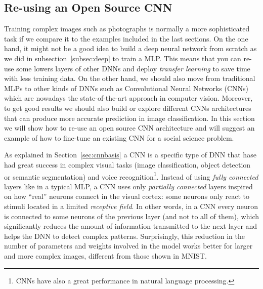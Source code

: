 \subsection{Re-using an Open Source CNN}\label{subsec:tuning}

Training complex images such as photographs is normally a more sophisticated task if we compare it to the examples included in the last sections. On the one hand, it might not be a good idea to build a deep neural network from scratch as we did in subsection~\ref{subsec:deep} to train a MLP. This means that you can re-use some lowers layers of other DNNs and deploy \textit{transfer learning} to save time with less training data. On the other hand, we should also move from traditional MLPs to other kinds of DNNs such as Convolutional Neural Networks (CNNs) which are  nowadays the state-of-the-art approach in computer vision. Moreover, to get good results we should also build or explore different CNNs architectures that can produce more accurate prediction in image classification.  In this section we will show how to re-use an open source CNN architecture and will suggest an example of how to fine-tune an existing CNN for a social science problem.

As explained in Section~\ref{sec:cnnbasis} a CNN is a specific type of DNN that hase had great success in complex visual tasks (image classification, object detection or semantic segmentation) and voice recognition\footnote{CNNs have also a great performance in natural language processing.}. Instead of using \textit{fully connected} layers like in a typical MLP, a CNN uses only \textit{partially connected} layers inspired on how ``real'' neurons connect in the visual cortex: some neurons only react to stimuli located in a limited \textit{receptive field}. In other words, in a CNN every neuron is connected to some neurons of the previous layer (and not to all of them), which significantly reduces the amount of information transmitted to the next layer and helps the DNN to detect complex patterns. Surprisingly, this reduction in the number of parameters and weights involved in the model works better for larger and more complex images, different from those shown in MNIST.

